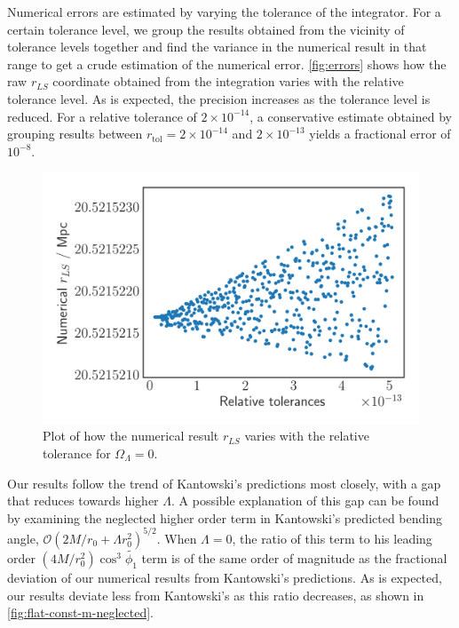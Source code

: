Numerical errors are estimated by varying the tolerance of the integrator. For a certain tolerance level, we group the results obtained from the vicinity of tolerance levels together and find the variance in the numerical result in that range to get a crude estimation of the numerical error. \autoref{fig:errors} shows how the raw $r_{LS}$ coordinate obtained from the integration varies with the relative tolerance level. As is expected, the precision increases as the tolerance level is reduced. For a relative tolerance of $2 \times 10^{-14}$, a conservative estimate obtained by grouping results between $r_{\text{tol}} = 2 \times 10^{-14}$ and $2 \times 10^{-13}$ yields a fractional error of $10^{-8}$. 

\begin{figure}
  \centering
  \includegraphics[height=0.5\linewidth]{images/errors.png}
  \caption{Plot of how the numerical result $r_{LS}$ varies with the relative tolerance for $\Omega_{\Lambda} = 0$. }
  \label{fig:errors}
\end{figure}

Our results follow the trend of Kantowski's predictions most closely, with a gap that reduces towards higher $\Lambda$. A possible explanation of this gap can be found by examining the neglected higher order term in Kantowski's predicted bending angle, $\mathcal{O}\left ( 2M/r_0 + \Lambda r_0^2 \right )^{5/2}$. When $\Lambda = 0$, the ratio of this term to his leading order $(4M/r_0^2) \cos^3 \tilde{\phi_1}$ term is of the same order of magnitude as the fractional deviation of our numerical results from Kantowski's predictions. As is expected, our results deviate less from Kantowski's as this ratio decreases, as shown in \autoref{fig:flat-const-m-neglected}. 

